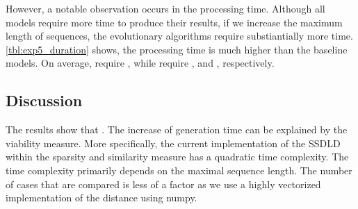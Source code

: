 \documentclass[./../../paper.tex]{subfiles}
\begin{document}
However, a notable observation occurs in the processing time. Although all models require more time to produce their results, if we increase the maximum length of sequences, the evolutionary algorithms require substiantially more time. \autoref{tbl:exp5_duration} shows, the processing time is much higher than the baseline models. On average,  require , while  require ,  and , respectively.

\subsection{Discussion}
The results show that . The increase of generation time can be explained by the viability measure. More specifically, the current implementation of the \gls{SSDLD} within the sparsity and similarity measure has a quadratic time complexity. The time complexity primarily depends on the maximal sequence length. The number of cases that are compared is less of a factor as we use a highly vectorized implementation of the distance using numpy.   
\end{document}
